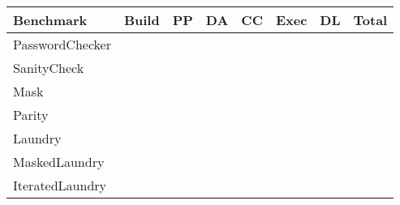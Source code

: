 \begin{center}
    \begin{table}
        \centering
        \begin{tabular}{|l|l|l|l|l|l|l|l|l|l|l|l|l|l|} 
        \hline
        \textbf{Benchmark} & \multicolumn{2}{l|}{Build} & \multicolumn{2}{l|}{PP} & \multicolumn{2}{l|}{DA} & \multicolumn{2}{l|}{CC} & \multicolumn{2}{l|}{Exec} & \multicolumn{2}{l|}{DL} & \textbf{Total}  \\ 
        \hline
        PasswordChecker    &  &                         &  &                                  &  &                                       &  &                                    &  &                             &  &                                   &                 \\ 
        \hline
        SanityCheck        &  &                         &  &                                  &  &                                       &  &                                    &  &                             &  &                                   &                 \\ 
        \hline
        Mask               &  &                         &  &                                  &  &                                       &  &                                    &  &                             &  &                                   &                 \\ 
        \hline
        Parity             &  &                         &  &                                  &  &                                       &  &                                    &  &                             &  &                                   &                 \\ 
        \hline
        Laundry            &  &                         &  &                                  &  &                                       &  &                                    &  &                             &  &                                   &                 \\ 
        \hline
        MaskedLaundry      &  &                         &  &                                  &  &                                       &  &                                    &  &                             &  &                                   &                 \\ 
        \hline
        IteratedLaundry    &  &                         &  &                                  &  &                                       &  &                                    &  &                             &  &                                   &                 \\ 

\end{tabular}
\end{table}
\end{center}
